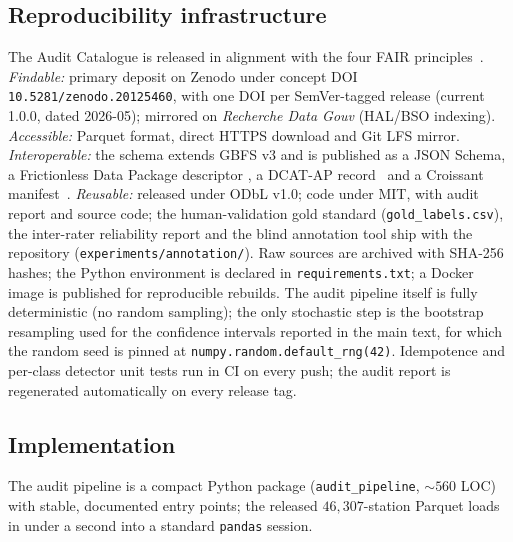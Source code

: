 \documentclass[11pt,a4paper]{article}
\newif\ifanonymous
\newcommand{\zdoi}{\ifanonymous\texttt{[deposited on Zenodo; DOI withheld for review]}\else\texttt{10.5281/zenodo.20125460}\fi}
\begin{document}
\subsection{Reproducibility infrastructure}\label{secRepro}
The Audit Catalogue is released in alignment with the four FAIR
principles~\cite{Wilkinson2016}. \emph{Findable:} primary deposit on
Zenodo under concept DOI \zdoi, with one
DOI per SemVer-tagged release (current 1.0.0, dated 2026-05); mirrored
on \emph{Recherche Data Gouv} (HAL/BSO indexing). \emph{Accessible:}
Parquet format, direct HTTPS download and Git LFS mirror.
\emph{Interoperable:} the schema extends GBFS v3 and is published as a
JSON Schema, a Frictionless Data Package descriptor
\cite{FrictionlessData2023}, a DCAT-AP record~\cite{DCATAP2021} and a
Croissant manifest~\cite{Croissant2024}. \emph{Reusable:} released
under ODbL v1.0; code under MIT, with audit report and source code; the
human-validation gold standard (\texttt{gold\_labels.csv}), the
inter-rater reliability report and the blind annotation tool ship with the
repository (\texttt{experiments/annotation/}).
Raw sources are archived with SHA-256 hashes; the Python
environment is declared in \texttt{requirements.txt}; a Docker image
is published for reproducible rebuilds. The audit pipeline itself
is fully deterministic (no random sampling); the only stochastic
step is the bootstrap resampling used for the confidence intervals
reported in the main text, for which the random seed is pinned at
\texttt{numpy.random.default\_rng(42)}. Idempotence and per-class
detector unit tests run in CI on every push; the audit report is
regenerated automatically on every release tag.

\subsection{Implementation}
The audit pipeline is a compact Python package
(\texttt{audit\_pipeline}, $\sim 560$ LOC) with stable, documented
entry points; the released $46{,}307$-station Parquet loads in under a
second into a standard \texttt{pandas} session.
\end{document}
